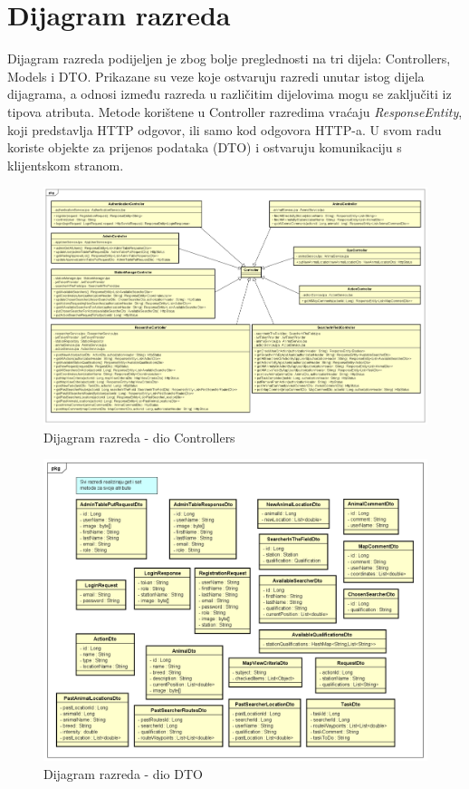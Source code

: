			
		\section{Dijagram razreda}
		Dijagram razreda podijeljen je zbog bolje preglednosti na tri dijela: Controllers, Models i DTO. Prikazane su veze koje ostvaruju razredi unutar istog dijela dijagrama, a odnosi između razreda u različitim dijelovima mogu se zaključiti iz tipova atributa. Metode korištene u Controller razredima vraćaju \textit{ResponseEntity}, koji predstavlja HTTP odgovor, ili samo kod odgovora HTTP-a. U svom radu koriste objekte za prijenos podataka (DTO) i ostvaruju komunikaciju s klijentskom stranom.
			
			\begin{figure}[H]
				\includegraphics[scale=0.5]{dijagrami/Controllers.png} 
				\centering
				\caption{Dijagram razreda - dio Controllers}
				\label{fig:promjene}
			\end{figure}
			
			\begin{figure}[H]
				\includegraphics[scale=0.5]{dijagrami/DTO.png} 
				\centering
				\caption{Dijagram razreda - dio DTO}
				\label{fig:promjene}
			\end{figure}
			
